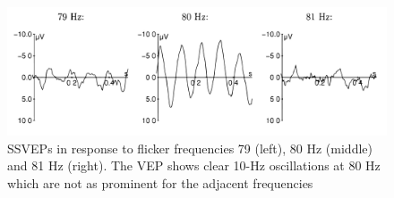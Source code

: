 \begin{figure}[h]
	\centering
  	\includegraphics[scale = 0.2]{chapter2/28.pdf}
  	\caption{ SSVEPs in response to flicker frequencies 79 (left), 80 Hz (middle) and 81 Hz (right). The VEP shows clear 10-Hz oscillations at 80 Hz which are not as prominent for the adjacent frequencies}
\end{figure}


